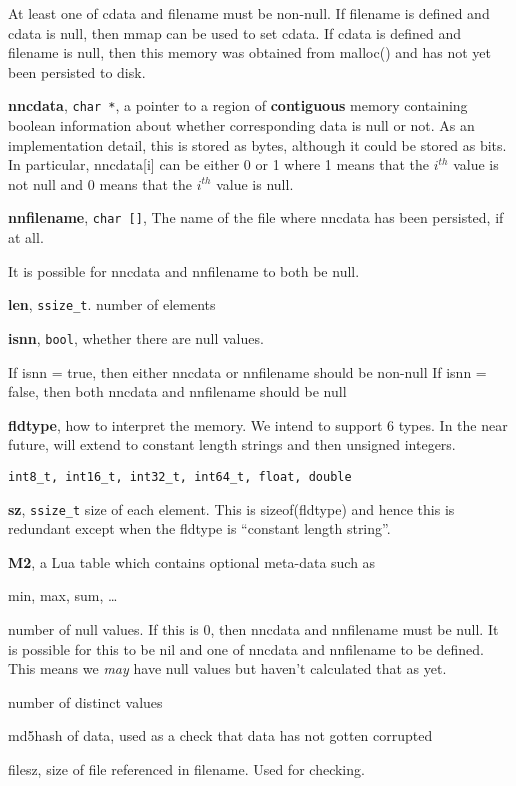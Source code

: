 At least one of cdata and filename must be non-null.
If filename is defined and cdata is null, then mmap can be used to set cdata. If
cdata is defined and filename is null, then this memory was obtained from
malloc()
and has not yet been persisted to disk.
\item {\bf nncdata}, \verb+char *+, a pointer to a region of {\bf contiguous} memory
containing boolean information about whether corresponding data is null or not.
As an implementation detail, this is stored as bytes, although it could be
stored as bits. In particular, nncdata[i] can be either 0 or 1 where 
1 means that the \(i^{th}\) value is not null and 
0 means that the \(i^{th}\) value is null. 

\item {\bf nnfilename}, \verb+char []+, The name of the file where nncdata has been
persisted, if at all. 

It is possible for nncdata and nnfilename to both be null.
\item {\bf len}, \verb+ssize_t+. number of elements
\item {\bf isnn}, \verb+bool+, whether there are null values. 

If isnn = true, then either nncdata or nnfilename should be non-null
If isnn = false, then both nncdata and nnfilename should be null
\item {\bf fldtype}, how to interpret the memory. We intend to support 6 types.
In the near  future, will extend to constant length strings and then unsigned integers. 
\begin{verbatim}
int8_t, int16_t, int32_t, int64_t, float, double
\end{verbatim}

\item {\bf sz}, \verb+ssize_t+ size of each element. This is sizeof(fldtype) and
hence this is redundant except when the fldtype is ``constant length
string''.
\ee
\item {\bf M2}, a Lua table which contains optional meta-data such as 
\be
\item min, max, sum, \ldots
\item number of null values. If this is 0, then nncdata and nnfilename must be
null. It is possible for this to be nil and one of nncdata and nnfilename to be
defined. This means we {\em may} have null values but haven't calculated that as
yet. 
\item number of distinct values
\item md5hash of data, used as a check that data has not gotten corrupted
\item filesz, size of file referenced in filename. Used for checking.

